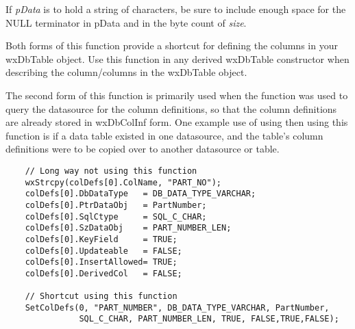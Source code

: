 

If {\it pData} is to hold a string of characters, be sure to include enough 
space for the NULL terminator in pData and in the byte count of {\it size}.

Both forms of this function provide a shortcut for defining the columns in 
your wxDbTable object.  Use this function in any derived wxDbTable 
constructor when describing the column/columns in the wxDbTable object.

The second form of this function is primarily used when the 
 function was used to query the 
datasource for the column definitions, so that the column definitions are 
already stored in wxDbColInf form.  One example use of using 
 then using this function is if 
a data table existed in one datasource, and the table's column definitions 
were to be copied over to another datasource or table.


\begin{verbatim}
    // Long way not using this function
    wxStrcpy(colDefs[0].ColName, "PART_NO");
    colDefs[0].DbDataType   = DB_DATA_TYPE_VARCHAR;
    colDefs[0].PtrDataObj   = PartNumber;
    colDefs[0].SqlCtype     = SQL_C_CHAR;
    colDefs[0].SzDataObj    = PART_NUMBER_LEN;
    colDefs[0].KeyField     = TRUE;
    colDefs[0].Updateable   = FALSE;
    colDefs[0].InsertAllowed= TRUE;
    colDefs[0].DerivedCol   = FALSE;

    // Shortcut using this function
    SetColDefs(0, "PART_NUMBER", DB_DATA_TYPE_VARCHAR, PartNumber,
               SQL_C_CHAR, PART_NUMBER_LEN, TRUE, FALSE,TRUE,FALSE);
\end{verbatim}


\label{wxdbtablesetcursor}




